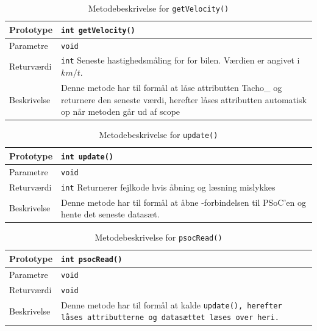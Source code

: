 \begin{table}[h!]
	\begin{tabularx}{\textwidth}{| L{2.5 cm} | Z |} \hline
		Prototype 	& \texttt{int getVelocity()} 	\\\hline
		Parametre 	& \texttt{void}   		\\\hline
		Returværdi 	& \texttt{int}  \newline Seneste hastighedsmåling for for bilen. Værdien er angivet i $km/t$. \\\hline
		Beskrivelse	& Denne metode har til formål at låse attributten Tacho\_ og returnere den seneste værdi, herefter låses attributten automatisk op når metoden går ud af scope \\\hline	
	\end{tabularx}
	\caption{Metodebeskrivelse for  \texttt{getVelocity()}}
	\label{table:met_getvelocity}
\end{table}

\begin{table}[h!]
	\begin{tabularx}{\textwidth}{| L{2.5 cm} | Z |} \hline
		Prototype 	& \texttt{int update()} 		\\\hline
		Parametre 	& \texttt{void}  		\\\hline
		Returværdi 	& \texttt{int}  \newline Returnerer fejlkode hvis åbning og læsning mislykkes \\\hline
		Beskrivelse	& Denne metode har til formål at åbne \IIC-forbindelsen til PSoC'en og hente det seneste datasæt. \\\hline
	\end{tabularx}
	\caption{Metodebeskrivelse for  \texttt{update()}}
	\label{table:met_update}
\end{table}

\begin{table}[h!]
	\begin{tabularx}{\textwidth}{| L{2.5 cm} | Z |} \hline
		Prototype 	& \texttt{int psocRead()} 		\\\hline
		Parametre 	& \texttt{void}  		\\\hline
		Returværdi 	& \texttt{void}  		\\\hline
		Beskrivelse	& Denne metode har til formål at kalde \texttt{update(), herefter låses attributterne og datasættet læses over heri.}\\\hline
	\end{tabularx}
	\caption{Metodebeskrivelse for  \texttt{psocRead()}}
	\label{table:met_psocRead}
\end{table}